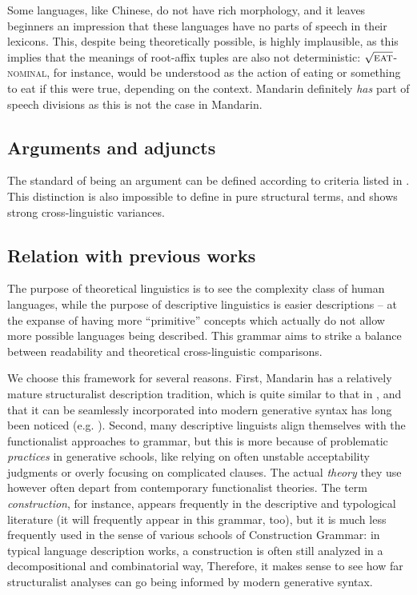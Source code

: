 \documentclass[UTF8, a4paper, oneside, scheme=plain, 12pt]{ctexrep}
\newcommand*{\term}[1]{\emph{#1}}
\newcommand*{\category}[1]{\textsc{#1}}
\newcommand*{\wordroot}[1]{$\sqrt{\text{\textsc{#1}}}$}
\begin{document}
{Some languages, like Chinese, do not have rich morphology,
and it leaves beginners an impression that these languages have no parts of speech in their lexicons.
This, despite being theoretically possible, is highly implausible,
as this implies that the meanings of root-affix tuples are also not deterministic:
\wordroot{eat}-\category{nominal}, for instance,
would be understood as the action of eating or something to eat if this were true,
depending on the context.
Mandarin definitely \emph{has} part of speech divisions
as this is not the case in Mandarin.

\subsection{Arguments and adjuncts}

The standard of being an argument can be defined according to 
criteria listed in .
This distinction is also impossible to define in pure structural terms,
and shows strong cross-linguistic variances.

\subsection{Relation with previous works}\label{sec:grammatical.previous}

The purpose of theoretical linguistics is to see the complexity class of human languages,
while the purpose of descriptive linguistics is easier descriptions
-- at the expanse of having more ``primitive'' concepts
which actually do not allow more possible languages being described.
This grammar aims to strike a balance between readability and theoretical cross-linguistic comparisons.

We choose this framework for several reasons.
First, Mandarin has a relatively mature structuralist description tradition,
which is quite similar to that in \citet{cgel},
and that it can be seamlessly incorporated into modern generative syntax 
has long been noticed (e.g. \citealt{deng2010formal}).
Second, many descriptive linguists align themselves with the functionalist approaches to grammar,
but this is more because of problematic \emph{practices} in generative schools,
like relying on often unstable acceptability judgments
or overly focusing on complicated clauses.
The actual \emph{theory} they use however often depart from contemporary functionalist theories.
The term \term{construction}, for instance,
appears frequently in the descriptive and typological literature
(it will frequently appear in this grammar, too),
but it is much less frequently used in the sense of various schools of Construction Grammar:
in typical language description works, a construction is often still analyzed 
in a decompositional and combinatorial way,
Therefore, it makes sense to see how far structuralist analyses can go
being informed by modern generative syntax.

}
\end{document}
